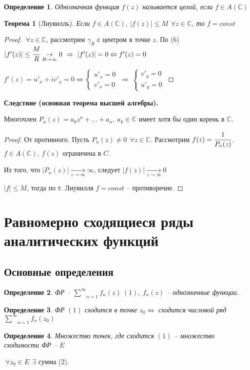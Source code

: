 \documentclass[draft]{article}
\newcommand{\then}{\ \Rightarrow\ }
\renewcommand{\C}{\mathbb{C}}
\newcommand{\msum}[2]{\underset{#1}{\overset{#2}{\sum}}}
\newcommand{\LRA}{\Leftrightarrow}
\newcommand{\g}{\gamma}
\newcommand{\E}{\ \exists}
\newcommand{\F}{\ \forall}
\newcommand{\sys}[1]{\left\{\begin{matrix}#1\end{matrix}\right.}
\newcommand{\opr}[1]{\begin{opred}#1\end{opred}}
\newtheorem*{theor}{Теорема}
\newtheorem*{opred}{Определение}
\theoremstyle{remark}
\begin{document}
\opr{Однозначная функция $f(z)$ называется целой, если $f\in A(\C)$}
\begin{theor}[Лиувилль]
Если $f\in A(\C),\ |f(z)|\leq M\ \F z\in \C$, то $f=const$
\end{theor}
\begin{proof}
$\F z\in\C$, рассмотрим $\g_R$ с центром в точке $z$. По (6) $|f'(z)|\leq \cfrac MR\underset{R\to\infty}{\to} 0 \then |f'(z)|=0 \LRA f'(z)=0$

$f'(z)=u'_x+iv'_x=0\LRA \sys{u'_x=0 \\ v'_x=0} \then \sys{v'_y=0 \\ u'_y=0}$
\end{proof}
{\bfseries Следствие (основная теорема высшей алгебры).}

Многочлен $P_n(z)=a_0z^n+\ldots+a_n,\ a_k\in\C$ имеет хотя бы один корень в $\C$.
\begin{proof}
От противного. Пусть $P_n(z)\neq0\ \F z\in\C$. Рассмотрим $f(z)=\cfrac 1{P_n(z)}$. $f\in A(\C),\ f(z)$ ограничена в $C$.

Из того, что $|P_n(z)|\underset{z\to\infty}{\to}\infty$, следует $|f(z)|\underset{z\to\infty}{\to}0$

$|f|\leq M$, тогда по т. Лиувилля $f=const$ -- противоречие.
\end{proof}


\newpage

\section{Равномерно сходящиеся ряды аналитических функций}

\subsection{Основные определения}

\opr{ФР -- $\msum{n=1}{\infty}f_n(z)\ (1),\ f_n(z)$ -- однозначные функции.}

\opr{ФР $(1)$ сходится в точке $z_0\LRA$ сходится числовой ряд $\msum{n=1}{\infty}f_n(z_0)$}

\opr{Множество точек, где сходится $(1)$ -- множество сходимости ФР -- $E$}

$\F z_0\in E\ \E$ сумма (2).
\end{document}
